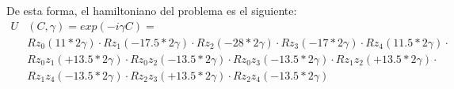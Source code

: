 \documentclass{article}
\begin{document}
\par
De esta forma, el hamiltoniano del problema es el siguiente:
\begin{align*}
  U&(C, \gamma) = exp(-i \gamma C) = &&\\
   &Rz_0(11*2\gamma) \cdot Rz_1(-17.5*2\gamma) \cdot Rz_2(-28*2\gamma) \cdot Rz_3(-17*2\gamma) \cdot Rz_4(11.5*2\gamma) \cdot \\
   &Rz_0z_1(+13.5 * 2\gamma) \cdot Rz_0z_2(-13.5 * 2\gamma) \cdot Rz_0z_3(-13.5 * 2\gamma) \cdot Rz_1z_2(+13.5 * 2\gamma) \cdot \\
   &Rz_1z_4(-13.5 * 2\gamma) \cdot Rz_2z_3(+13.5 * 2\gamma) \cdot Rz_2z_4(-13.5 * 2\gamma)
\end{align*}





\end{document}
